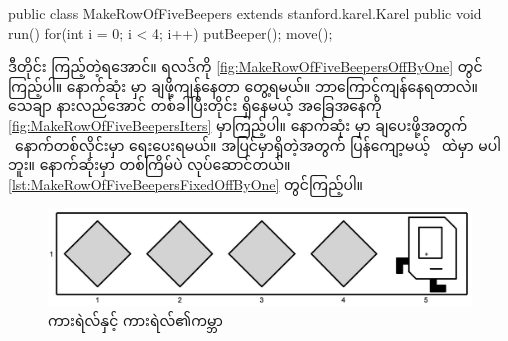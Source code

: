 \begin{sloppypar}
\begin{lstcodesimple}[float, caption=ပထမစမ်းကြည့်ပုံ, label={lst:MakeRowOfFiveBeepersOffByOne}]
public class MakeRowOfFiveBeepers extends stanford.karel.Karel{
    public void run(){
            for(int i = 0; i < 4; i++) {
                    putBeeper();
                    move();
            }
    }
}
\end{lstcodesimple}

ဒီတိုင်း \mmrun ကြည့်တဲ့ရအောင်။ ရလဒ်ကို \Fig \vref{fig:MakeRowOfFiveBeepersOffByOne} တွင်ကြည့်ပါ။  နောက်ဆုံး \mmcorner မှာ \mmbeeper ချဖို့ကျန်နေတာ တွေ့ရမယ်။ ဘာကြောင့်ကျန်နေရတာလဲ။ သေချာ နားလည်အောင် \mmiteration တစ်ခါပြီးတိုင်း ရှိနေမယ့် အခြေအနေကို \vref*{fig:MakeRowOfFiveBeepersIters} မှာကြည့်ပါ။ နောက်ဆုံး \mmcorner မှာ \mmbeeper ချပေးဖို့အတွက်   \mmClosingCurlyBrace\ နောက်တစ်လိုင်းမှာ  \mmcommand ရေးပေးရမယ်။ \enForLoopBody အပြင်မှာရှိတဲ့အတွက် ပြန်ကျော့မယ့် \mmcommand\ ထဲမှာ မပါဘူး။ နောက်ဆုံးမှာ တစ်ကြိမ်ပဲ လုပ်ဆောင်တယ်။ \Lst \vref*{lst:MakeRowOfFiveBeepersFixedOffByOne} တွင်ကြည့်ပါ။

\begin{figure}[htb]
    \caption{ကားရဲလ်နှင့်  ကားရဲလ်၏ကမ္ဘာ}\label{fig:MakeRowOfFiveBeepersOffByOne}
    \includegraphics[scale=0.2, left]{ch02/MakeRowOfFiveBeepers/off_by_one_1.jpg}
\end{figure}


\end{sloppypar}
